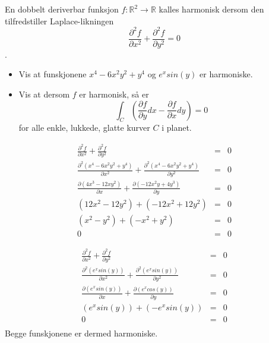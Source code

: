\documentclass{../../myassignment}
\begin{document}
	\pagebreak
	\begin{problem}
		En dobbelt deriverbar funksjon $f:\mathbb{R}^2\to\mathbb{R}$ kalles harmonisk dersom den tilfredstiller Laplace-likningen $$\frac{\partial^2f}{\partial x^2}+\frac{\partial^2f}{\partial y^2}=0$$.
			\begin{itemize}
				\item Vis at funskjonene $x^4-6x^2y^2+y^4$ og $e^xsin(y)$ er harmoniske.
				\item Vis at dersom $f$ er harmonisk, så er $$\int_C (\frac{\partial f}{\partial y}dx - \frac{\partial f}{\partial x}dy) = 0$$ for alle enkle, lukkede, glatte kurver $C$ i planet.
			\end{itemize}
	\end{problem}
	\begin{answer}
		\begin{eqnarray*}
			\frac{\partial^2f}{\partial x^2}+\frac{\partial^2f}{\partial y^2} &=& 0 \\
			\frac{\partial^2 (x^4-6x^2y^2+y^4)}{\partial x^2}+\frac{\partial^2 (x^4-6x^2y^2+y^4)}{\partial y^2} &=& 0 \\
			\frac{\partial (4x^3-12xy^2)}{\partial x}+\frac{\partial (-12x^2y+4y^3)}{\partial y} &=& 0 \\
			(12x^2-12y^2) + (-12x^2+12y^2) &=& 0 \\
			(x^2-y^2) + (-x^2+y^2) &=& 0 \\
			0 &=& 0
		\end{eqnarray*}

	\end{answer}
	\begin{answer}
		\begin{eqnarray*}
			\frac{\partial^2f}{\partial x^2}+\frac{\partial^2f}{\partial y^2} &=& 0 \\
			\frac{\partial^2 (e^x sin(y))}{\partial x^2}+\frac{\partial^2 (e^x sin(y))}{\partial y^2} &=& 0 \\
			\frac{\partial (e^x sin(y))}{\partial x}+\frac{\partial (e^x cos(y))}{\partial y} &=& 0 \\
			(e^x sin(y)) + (-e^x sin(y)) &=& 0 \\
			0 &=& 0 \\
		\end{eqnarray*}
		Begge funskjonene er dermed harmoniske.

	\end{answer}
\end{document}
